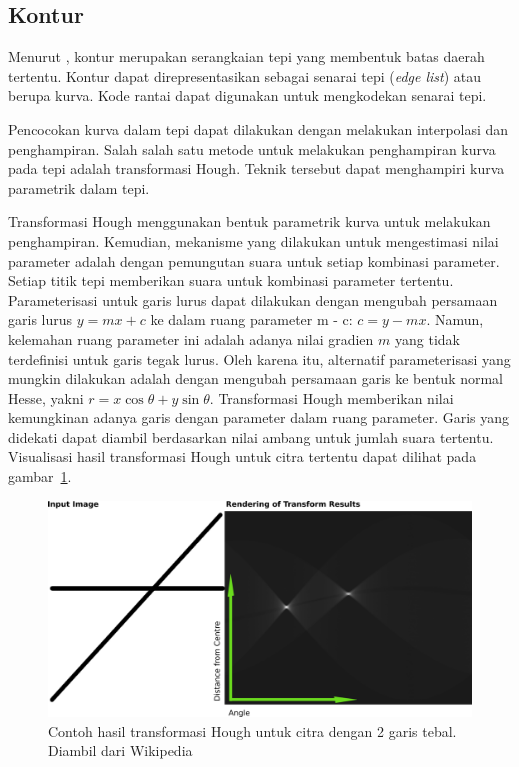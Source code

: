 \documentclass[conference, a4paper]{IEEEtran}
\begin{document}
\subsection{Kontur}
Menurut \cite{munir2022kontur}, kontur merupakan serangkaian tepi yang membentuk batas daerah tertentu. Kontur dapat direpresentasikan sebagai senarai tepi (\textit{edge list}) atau berupa kurva. Kode rantai dapat digunakan untuk mengkodekan senarai tepi.

Pencocokan kurva dalam tepi dapat dilakukan dengan melakukan interpolasi dan penghampiran. Salah salah satu metode untuk melakukan penghampiran kurva pada tepi adalah transformasi Hough. Teknik tersebut dapat menghampiri kurva parametrik dalam tepi.

Transformasi Hough menggunakan bentuk parametrik kurva untuk melakukan penghampiran. Kemudian, mekanisme yang dilakukan untuk mengestimasi nilai parameter adalah dengan pemungutan suara untuk setiap kombinasi parameter. Setiap titik tepi memberikan suara untuk kombinasi parameter tertentu. Parameterisasi untuk garis lurus dapat dilakukan dengan mengubah persamaan garis lurus $y = mx + c$ ke dalam ruang parameter m - c: $c = y - mx$. Namun, kelemahan ruang parameter ini adalah adanya nilai gradien $m$ yang tidak terdefinisi untuk garis tegak lurus. Oleh karena itu, alternatif parameterisasi yang mungkin dilakukan adalah dengan mengubah persamaan garis ke bentuk normal Hesse, yakni $r = x \cos \theta + y \sin \theta$. Transformasi Hough memberikan nilai kemungkinan adanya garis dengan parameter dalam ruang parameter. Garis yang didekati dapat diambil berdasarkan nilai ambang untuk jumlah suara tertentu. Visualisasi hasil transformasi Hough untuk citra tertentu dapat dilihat pada gambar~\ref{hough}.

\begin{figure}
  \includegraphics[width=\columnwidth]{img/hough_ex.png}
  \caption{Contoh hasil transformasi Hough untuk citra dengan 2 garis tebal. Diambil dari Wikipedia}\label{hough}
\end{figure}
\end{document}
